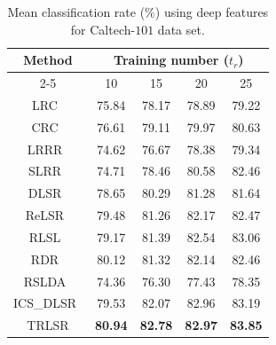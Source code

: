 \begin{table}
\caption{Mean classification rate ($\%$) using deep features for Caltech-$101$ data set.}
\label{table: TRLSR_cal_101}
\centering
\begin{tabular}{|c|c|c|c|c|}
\hline
\multirow{2}{*}{Method} & \multicolumn{4}{c|}{Training number ($t_r$)}\\ 
\cline{2-5} 
& \multicolumn{1}{c|}{10}             & \multicolumn{1}{c|}{15}             & \multicolumn{1}{c|}{20}             & 25             \\ \hline 
LRC~\cite{LRC}                        & \multicolumn{1}{c|}{75.84}          & \multicolumn{1}{c|}{78.17}          & \multicolumn{1}{c|}{78.89}          & 79.22          \\ \hline
CRC~\cite{CRC}                        & \multicolumn{1}{c|}{76.61}          & \multicolumn{1}{c|}{79.11}          & \multicolumn{1}{c|}{79.97}          & 80.63          \\ \hline
LRRR~\cite{LRLR_SLRR}                       & \multicolumn{1}{c|}{74.62}          & \multicolumn{1}{c|}{76.67}          & \multicolumn{1}{c|}{78.38}          & 79.34          \\ \hline
SLRR~\cite{LRLR_SLRR}                       & \multicolumn{1}{c|}{74.71}          & \multicolumn{1}{c|}{78.46}          & \multicolumn{1}{c|}{80.58}          & 82.46          \\ \hline
DLSR~\cite{DLSR}                       & \multicolumn{1}{c|}{78.65}          & \multicolumn{1}{c|}{80.29}          & \multicolumn{1}{c|}{81.28}          & 81.64          \\ \hline
ReLSR~\cite{ReLSR}                      & \multicolumn{1}{c|}{79.48}          & \multicolumn{1}{c|}{81.26}          & \multicolumn{1}{c|}{82.17}          & 82.47          \\ \hline
RLSL~\cite{RLSL}                       & \multicolumn{1}{c|}{79.17}          & \multicolumn{1}{c|}{81.39}          & \multicolumn{1}{c|}{82.54}          & 83.06          \\ \hline
RDR~\cite{RDR}                        & \multicolumn{1}{c|}{80.12}          & \multicolumn{1}{c|}{81.32}          & \multicolumn{1}{c|}{82.14}          & 82.46          \\ \hline
RSLDA~\cite{RSLDA}                      & \multicolumn{1}{c|}{74.36}          & \multicolumn{1}{c|}{76.30}          & \multicolumn{1}{c|}{77.43}          & 78.35          \\ \hline
ICS\_DLSR~\cite{ICS_DLSR}                  & \multicolumn{1}{c|}{79.53}          & \multicolumn{1}{c|}{82.07}          & \multicolumn{1}{c|}{82.96}          & 83.19          \\ \hline
TRLSR                      & \multicolumn{1}{c|}{\textbf{80.94}} & \multicolumn{1}{c|}{\textbf{82.78}} & \multicolumn{1}{c|}{\textbf{82.97}} & \textbf{83.85} \\ \hline
\end{tabular}
\end{table}
%
